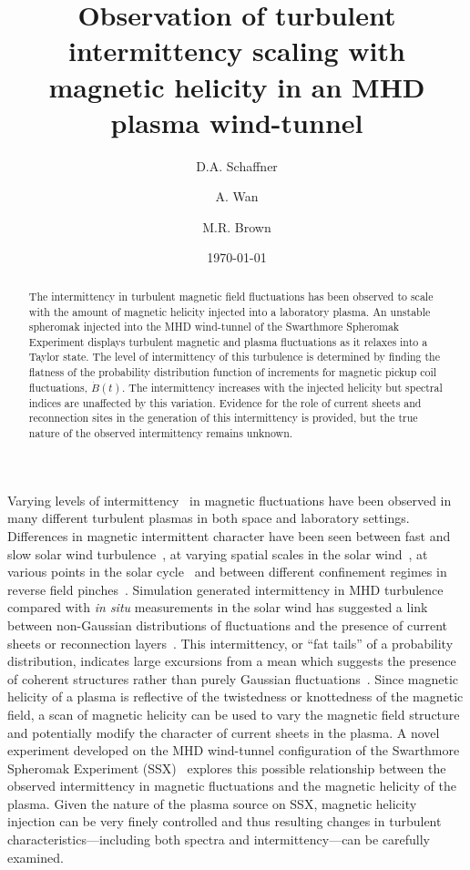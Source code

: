\documentclass[aps,prl,amsmath,amssymb,reprint,superscriptaddress]{revtex4-1} %
\begin{document}
\title{Observation of turbulent intermittency scaling with magnetic helicity in an MHD plasma wind-tunnel}

\author{D.A. Schaffner}
\author{A. Wan}
\author{M.R. Brown}
\date{\today}
\begin{abstract}
The intermittency in turbulent magnetic field fluctuations has been observed to scale with the amount of magnetic helicity injected into a laboratory plasma. An unstable spheromak injected into the MHD wind-tunnel of the Swarthmore Spheromak Experiment displays turbulent magnetic and plasma fluctuations as it relaxes into a Taylor state. The level of intermittency of this turbulence is determined by finding the flatness of the probability distribution function of increments for magnetic pickup coil fluctuations, $\dot{B}(t)$. The intermittency increases with the injected helicity but spectral indices are unaffected by this variation. Evidence for the role of current sheets and reconnection sites in the generation of this intermittency is provided, but the true nature of the observed intermittency remains unknown.
\end{abstract}

\maketitle

Varying levels of intermittency~\cite{frisch95} in magnetic fluctuations have been observed in many different turbulent plasmas in both space and laboratory settings. Differences in magnetic intermittent character have been seen between fast and slow solar wind turbulence~\cite{sorrisovalvo99}, at varying spatial scales in the solar wind~\cite{wan12}, at various points in the solar cycle~\cite{hnat07} and between different confinement regimes in reverse field pinches~\cite{sorrisovalvo01,marrelli05}. Simulation generated intermittency in MHD turbulence~\cite{Greco08,Greco09,Wan09,Servidio11b} compared with {\it in situ} measurements in the solar wind has suggested a link between non-Gaussian distributions of fluctuations and the presence of current sheets or reconnection layers~\cite{veltri99,carbone90}. This intermittency, or "`fat tails"' of a probability distribution, indicates large excursions from a mean which suggests the presence of coherent structures rather than purely Gaussian fluctuations~\cite{Greco08}.  Since magnetic helicity of a plasma is reflective of the twistedness or knottedness of the magnetic field, a scan of magnetic helicity can be used to vary the magnetic field structure and potentially modify the character of current sheets in the plasma. A novel experiment developed on the MHD wind-tunnel configuration of the Swarthmore Spheromak Experiment (SSX)~\cite{Gray13,schaffner14} explores this possible relationship between the observed intermittency in magnetic fluctuations and the magnetic helicity of the plasma. Given the nature of the plasma source on SSX, magnetic helicity injection can be very finely controlled and thus resulting changes in turbulent characteristics---including both spectra and intermittency---can be carefully examined.
\end{document}
